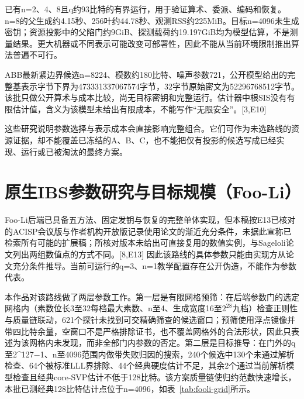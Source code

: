 \documentclass[UTF8,a4paper,12pt,oneside,openany,fontset=fandol]{ctexrep}
\begin{document}
已有n=2、4、8且q约93比特的有界运行，用于验证算术、委派、编码和恢复。n=8的父生成约4.15秒、256叶约44.78秒、观测RSS约225MiB。目标n=4096未生成密钥；资源投影中的父陷门约9GiB、探测载荷约19.197GiB均为模型估算，不是测量结果。更大机器或不同表示可能改变可部署性，因此不能从当前环境限制推出算法普遍不可行。

ABB最新紧边界候选n=8224、模数约180比特、噪声参数721，公开模型给出的完整基表示字节下界为473331337067574字节，32字节原始密文为52296768512字节。该批只做公开算术与成本比较，尚无目标密钥和完整运行。估计器中根SIS没有有限估计值，含义为该模型未给出有限成本，不能写作“无限安全”。[3,E10]

这些研究说明参数选择与表示成本会直接影响完整组合。它们可作为未选路线的资源证据，却不能覆盖已冻结的A、B、C，也不能把仅有投影的候选写成已经实现、运行或已被淘汰的最终方案。

\section{原生IBS参数研究与目标规模（Foo-Li）}
Foo-Li后端已具备五方法、固定发钥与恢复的完整单体实现，但本稿按E13已核对的ACISP会议版与作者机构开放版记录使用论文的渐近充分条件，未据此宣称已检索所有可能的扩展稿；所核对版本未给出可直接复用的数值实例，与Sageloli论文列出两组数值点的方式不同。[8,E13] 因此该路线的具体参数只能由实现方从论文充分条件推导。当前可运行的q=3、n=1教学配置存在公开伪造，不能作为参数代表。

本作品对该路线做了两层参数工作。第一层是有限网格预筛：在后端参数门的选定网格内（素数位长3至32每档最大素数、n至4、生成宽度16至\(2^{28}\)九档）检查正则性与质量链联动，621个探针未找到可交精确筛查的候选窗口；预筛使用浮点镜像并带四比特余量，空窗口不是严格排除证书，也不覆盖网格外的合法形状，因此只表述为该网格内未发现，而非全部门内参数的否定。第二层是目标推导：在门外的q至2\textasciicircum{}127\ensuremath{-}1、n至4096范围内做带失败归因的搜索，240个候选中130个未通过解析检查、64个被标准LLL界排除、44个经典硬度估计不足，其余2个通过当前解析模型检查且经典core-SVP估计不低于128比特。该方案质量链使归约范数快速增长，本批已测经典128比特估计点位于n=4096，如表~\ref{tab:fooli-grid}所示。
\end{document}
